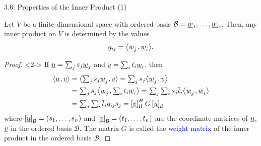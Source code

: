 \documentclass[10pt,letterpaper,english]{beamer}
\begin{document}
\begin{frame}{3.6: Properties of the Inner Product (1)}

\begin{theorem}
Let $V$ be a finite-dimensional space with ordered basis $\mathcal{B} = \underline{w}_1, \ldots, \underline{w}_n$.
Then, any inner product on $V$ is determined by the values \vspace{-1,5mm}
\begin{equation*}
g_{ij} = {\left\langle  \underline{w}_j  \mskip2mu ,  \underline{w}_i  \right\rangle}.
\end{equation*}
\end{theorem}

\begin{proof}<2->
If $\underline{u} = \sum_{j} s_j \underline{w}_j$ and $\underline{v} = \sum_{i} t_i \underline{w}_i$, then \vspace{-1.5mm}
\begin{equation*}
\begin{split}
{\left\langle  \underline{u}  \mskip2mu ,  \underline{v}  \right\rangle}
&= {\langle  \textstyle\sum_{j} s_j \underline{w}_j  \mskip1mu ,  \underline{v}  \rangle}
= \textstyle\sum_{j} s_j {\left\langle  \underline{w}_j  \mskip2mu ,  \underline{v}  \right\rangle} \\
&= \textstyle\sum_{j} s_j {\left\langle  \underline{w}_j  \mskip2mu ,  \textstyle\sum_{i} t_i \underline{w}_i  \right\rangle}
= \textstyle\sum_{j} \textstyle\sum_{i} s_j \overline{t}_i {\left\langle  \underline{w}_j  \mskip2mu ,  \underline{w}_i  \right\rangle} \\
&= \textstyle\sum_{j} \textstyle\sum_{i} \overline{t}_i g_{ij} s_j
= \left[ \underline{v} \right]_{\mathcal{B}}^H G \left[ \underline{u} \right]_{\mathcal{B}}
\end{split}
\end{equation*}
where $\left[ \underline{u} \right]_{\mathcal{B}} = (s_1,\ldots,s_n)$ and $\left[ \underline{v} \right]_{\mathcal{B}} = (t_1,\ldots,t_n)$ are the coordinate matrices of $\underline{u}$, $\underline{v}$ in the ordered basis $\mathcal{B}$.
The matrix $G$ is called the \textcolor{blue}{weight matrix} of the inner product in the ordered basis $\mathcal{B}$.
\end{proof}

\end{frame}
\end{document}
